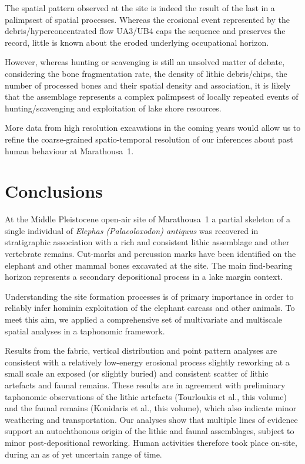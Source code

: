\documentclass[review,authoryear,times]{elsarticle} %
\begin{document}
The spatial pattern observed at the site is indeed the result of the last in a palimpsest of spatial processes. Whereas the erosional event represented by the debris/hyperconcentrated flow UA3/UB4 caps the sequence and preserves the record, little is known about the eroded underlying occupational horizon.

However, whereas hunting or scavenging is still an unsolved matter of debate, considering the bone fragmentation rate, the density of lithic debris/chips, the number of processed bones and their spatial density and association, it is likely that the assemblage represents a complex palimpsest of locally repeated events of hunting/scavenging and exploitation of lake shore resources.

More data from high resolution excavations in the coming years would allow us to refine the coarse-grained spatio-temporal resolution of our inferences about past human behaviour at Marathousa~1.

\section{Conclusions}

At the Middle Pleistocene open-air site of Marathousa~1 a partial skeleton of a single individual of \emph{Elephas (Palaeoloxodon) antiquus} was recovered in stratigraphic association with a rich and consistent lithic assemblage and other vertebrate remains. Cut-marks and percussion marks have been identified on the elephant and other mammal bones excavated at the site. The main find-bearing horizon represents a secondary depositional process in a lake margin context.

Understanding the site formation processes is of primary importance in order to reliably infer hominin exploitation of the elephant carcass and other animals. To meet this aim, we applied a comprehensive set of multivariate and multiscale spatial analyses in a taphonomic framework.

Results from the fabric, vertical distribution and point pattern analyses are consistent with a relatively low-energy erosional process slightly reworking at a small scale an exposed (or slightly buried) and consistent scatter of lithic artefacts and faunal remains. These results are in agreement with preliminary taphonomic observations of the lithic artefacts (Tourloukis et al., this volume) and the faunal remains (Konidaris et al., this volume), which also indicate minor weathering and transportation. Our analyses show that multiple lines of evidence support an autochthonous origin of the lithic and faunal assemblages, subject to minor post-depositional reworking. Human activities therefore took place on-site, during an as of yet uncertain range of time.
\end{document}
